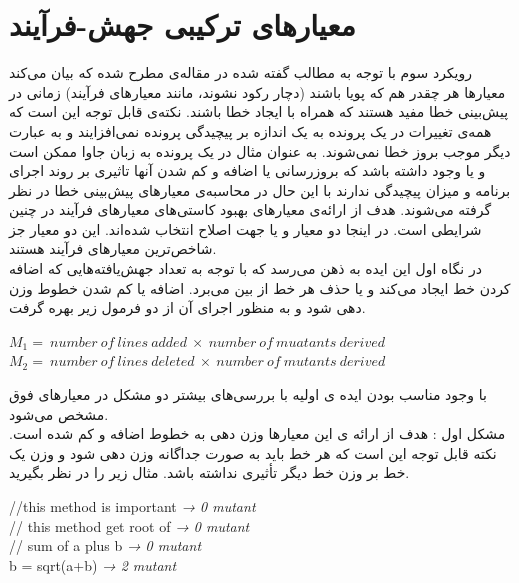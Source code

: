 \section{معیارهای ترکیبی جهش-فرآیند}
رویکرد سوم با توجه به مطالب گفته شده در مقاله‌ی \cite{rahman2013and} مطرح شده که بیان می‌کند معیارها هر چقدر هم که پویا باشند (دچار رکود نشوند، مانند معیارهای فرآیند) زمانی در پیش‌بینی خطا مفید هستند که همراه با ایجاد خطا باشند. نکته‌ی قابل توجه این است که همه‌ی تغییرات در یک پرونده به یک اندازه  بر پیچیدگی پرونده نمی‌افزایند و به عبارت دیگر موجب بروز خطا نمی‌شوند. به عنوان مثال در یک پرونده به زبان جاوا ممکن است  و یا  وجود داشته باشد که بروزرسانی یا اضافه و کم شدن آنها تاثیری بر روند اجرای برنامه و میزان پیچیدگی ندارند با این حال در محاسبه‌ی معیارهای پیش‌بینی خطا در نظر گرفته می‌شوند. هدف از ارائه‌ی معیارهای  بهبود کاستی‌های معیارهای فرآیند در چنین شرایطی است. در اینجا دو معیار  و یا   جهت اصلاح انتخاب شده‌اند.  این دو معیار جز شاخص‌ترین معیارهای فرآیند هستند.\\
در نگاه اول  این ایده به ذهن می‌رسد که با توجه به تعداد جهش‌یافته‌هایی که  اضافه   کردن  خط ایجاد می‌کند و یا حذف هر خط  از بین می‌برد. اضافه یا کم شدن خطوط وزن دهی شود و به منظور اجرای آن از دو  فرمول زیر بهره گرفت.\\
\begin{latin}
	
	$M_1 =\ number\ of\ lines\ added\ \times \ number\ of\ muatants\ derived$\\
	
	$M_2 =\ number\ of\ lines\ deleted\ \times \ number\ of\ mutants\ derived$\\
\end{latin}


با وجود مناسب بودن ایده ی اولیه با بررسی‌های بیشتر دو مشکل در معیارهای فوق مشخص می‌شود.\\
مشکل اول : هدف از ارائه ی این معیارها وزن دهی به خطوط اضافه و کم شده است. نکته قابل توجه این است که هر خط باید به صورت جداگانه وزن دهی شود و وزن یک خط بر وزن خط دیگر تأثیری نداشته باشد. مثال زیر را در نظر بگیرید.
\begin{latin}
\flushleft
//this method is important  \emph{→ 0 mutant} \\
// this method get root of \emph{→ 0 mutant}\\
// sum of a plus b \emph{→ 0 mutant} \\ 
b = sqrt(a+b) \emph{→ 2 mutant} \\
\end{latin}

